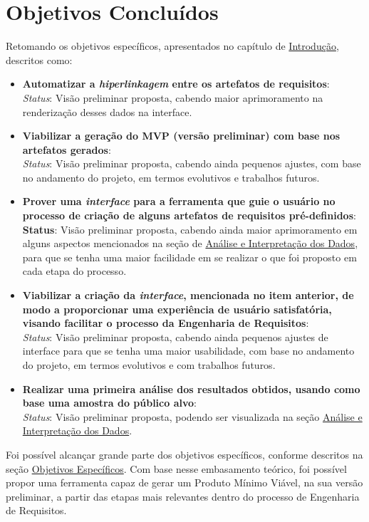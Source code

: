 \section{Objetivos Concluídos}
\label{sec:objetivos_concluido}
Retomando os objetivos específicos, apresentados no capítulo de \hyperref[chap:intro]{Introdução}, descritos como:

\begin{itemize}
    \item \textbf{Automatizar a \textit{hiperlinkagem} entre os artefatos de requisitos}:\\
    \textit{Status}: Visão preliminar proposta, cabendo maior aprimoramento na renderização desses dados na interface. \\
    \item \textbf{Viabilizar a geração do MVP (versão preliminar) com base nos artefatos gerados}:\\
    \textit{Status}: Visão preliminar proposta, cabendo ainda pequenos ajustes, com base no andamento do projeto, em termos evolutivos e trabalhos futuros.
    \item \textbf{Prover uma \textit{interface} para a ferramenta que guie o usuário no processo de criação de alguns artefatos de requisitos pré-definidos}:\\
    \textbf{Status}: Visão preliminar proposta, cabendo ainda maior aprimoramento em alguns aspectos mencionados na seção de \hyperref[sec:ana_int_dados]{Análise e Interpretação dos Dados}, para que se tenha uma maior facilidade em se realizar o que foi proposto em cada etapa do processo.
    \item  \textbf{Viabilizar a criação da \textit{interface}, mencionada no item anterior, de modo a proporcionar uma experiência de usuário satisfatória, visando facilitar o processo da Engenharia de Requisitos}:\\
    \textit{Status}: Visão preliminar proposta, cabendo ainda pequenos ajustes de interface para que se tenha uma maior usabilidade, com base no andamento do projeto, em termos evolutivos e com trabalhos futuros.
    \item  \textbf{Realizar uma primeira análise dos resultados obtidos, usando como base uma amostra do público alvo}:\\
    \textit{Status}: Visão preliminar proposta, podendo ser visualizada na seção \hyperref[sec:ana_int_dados]{Análise e Interpretação dos Dados}.
\end{itemize}

Foi possível alcançar grande parte dos objetivos específicos, conforme descritos na seção \hyperref[sec:objetivos_especificos]{Objetivos Específicos}. Com base nesse embasamento teórico, foi possível propor uma ferramenta capaz de gerar um Produto Mínimo Viável, na sua versão preliminar, a partir das etapas mais relevantes dentro do processo de Engenharia de Requisitos.

